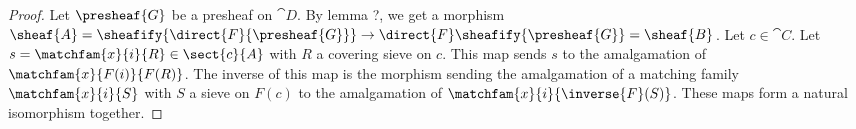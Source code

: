 \begin{proof}
Let $\presheaf{G}$ be a presheaf on $\cat{D}$.
By lemma ?, we get a morphism 
$\sheaf{A} = \sheafify{\direct{F}{\presheaf{G}}} \rightarrow \direct{F}\sheafify{\presheaf{G}} = \sheaf{B}$.
Let $c\in \cat{C}$.
Let $s = \matchfam{x}{i}{R} \in \sect{c}{A}$ with $R$ a covering sieve on $c$.
This map sends $s$ to the amalgamation of $\matchfam{x}{F(i)}{F(R)}$.
The inverse of this map is the morphism sending the amalgamation of a matching family $\matchfam{x}{i}{S}$ with $S$ a sieve on $F(c)$
to the amalgamation of $\matchfam{x}{i}{\inverse{F}(S)}$.
These maps form a natural isomorphism together.
\end{proof}